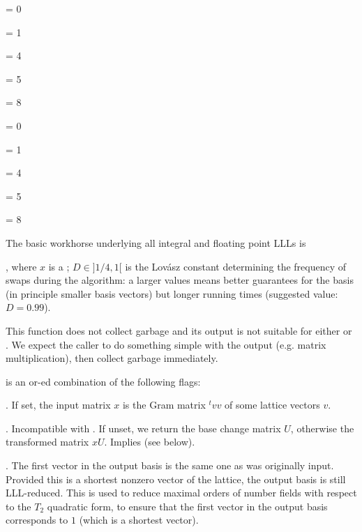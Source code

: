 \item {}

 \fl = 0

 \fl = 1

 \fl = 4

 \fl = 5

 \fl = 8

\item {}

 \fl = 0

 \fl = 1

 \fl = 4

 \fl = 5

 \fl = 8

\smallskip

The basic workhorse underlying all integral and floating point LLLs is

, where $x$ is a ;
$D \in ]1/4,1[$ is the Lov\'{a}sz constant determining the frequency of
swaps during the algorithm: a larger values means better guarantees for
the basis (in principle smaller basis vectors) but longer running times
(suggested value: $D = 0.99$).

 This function does not collect garbage and its output
is not suitable for either  or . We expect
the caller to do something simple with the output (e.g. matrix
multiplication), then collect garbage immediately.

\noindent{} is an or-ed combination of the following flags:

\item  {}. If set, the input matrix $x$ is the Gram matrix ${}^t
v v$ of some lattice vectors $v$.

\item  {}. Incompatible with . If unset, we
return the base change matrix $U$, otherwise the transformed matrix $x U$.
Implies  (see below).

\item  {}. The first vector in the output basis is the same
one as was originally input. Provided this is a shortest nonzero vector of
the lattice, the output basis is still LLL-reduced. This is used to reduce
maximal orders of number fields with respect to the $T_2$ quadratic form, to
ensure that the first vector in the output basis corresponds to $1$ (which is
a shortest vector).

